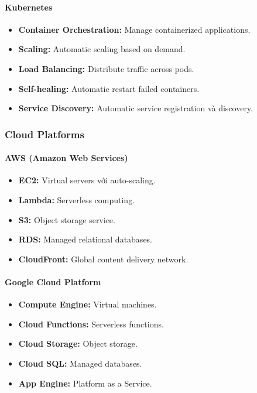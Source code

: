 \documentclass[a4paper,12pt]{report}
\begin{document}
\paragraph{Kubernetes}
\begin{itemize}
    \item \textbf{Container Orchestration:} Manage containerized applications.
    \item \textbf{Scaling:} Automatic scaling based on demand.
    \item \textbf{Load Balancing:} Distribute traffic across pods.
    \item \textbf{Self-healing:} Automatic restart failed containers.
    \item \textbf{Service Discovery:} Automatic service registration và discovery.
\end{itemize}

\subsubsection{Cloud Platforms}

\paragraph{AWS (Amazon Web Services)}
\begin{itemize}
    \item \textbf{EC2:} Virtual servers với auto-scaling.
    \item \textbf{Lambda:} Serverless computing.
    \item \textbf{S3:} Object storage service.
    \item \textbf{RDS:} Managed relational databases.
    \item \textbf{CloudFront:} Global content delivery network.
\end{itemize}

\paragraph{Google Cloud Platform}
\begin{itemize}
    \item \textbf{Compute Engine:} Virtual machines.
    \item \textbf{Cloud Functions:} Serverless functions.
    \item \textbf{Cloud Storage:} Object storage.
    \item \textbf{Cloud SQL:} Managed databases.
    \item \textbf{App Engine:} Platform as a Service.
\end{itemize}
\end{document}
